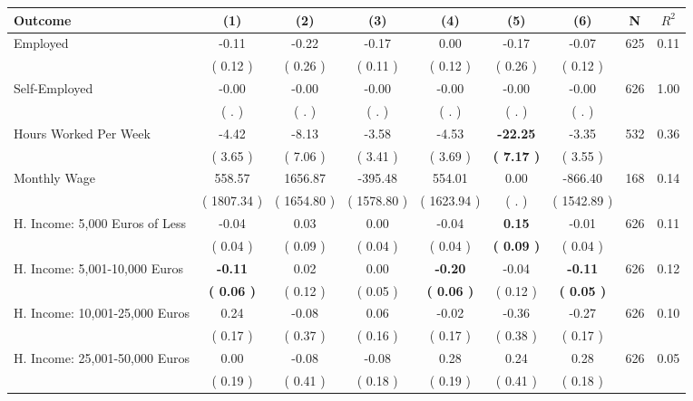 \begin{tabular}{lcccccccc}
\toprule
 \textbf{Outcome} & \textbf{(1)} & \textbf{(2)} & \textbf{(3)} & \textbf{(4)} & \textbf{(5)} & \textbf{(6)} & \textbf{N} & \textbf{$ R^2$} \\
\midrule
Employed &     -0.11 &     -0.22 &     -0.17 &      0.00 &     -0.17 &     -0.07 & 625 &       0.11 \\ 
 & (     0.12 ) & (     0.26 ) & (     0.11 ) & (     0.12 ) & (     0.26 ) & (     0.12 ) & \\
Self-Employed &     -0.00 &     -0.00 &     -0.00 &     -0.00 &     -0.00 &     -0.00 & 626 &       1.00 \\ 
 & (        . ) & (        . ) & (        . ) & (        . ) & (        . ) & (        . ) & \\
Hours Worked Per Week &     -4.42 &     -8.13 &     -3.58 &     -4.53 & \textbf{   -22.25} &     -3.35 & 532 &       0.36 \\ 
 & (     3.65 ) & (     7.06 ) & (     3.41 ) & (     3.69 ) & \textbf{(     7.17 )} & (     3.55 ) & \\
Monthly Wage &    558.57 &   1656.87 &   -395.48 &    554.01 &      0.00 &   -866.40 & 168 &       0.14 \\ 
 & (  1807.34 ) & (  1654.80 ) & (  1578.80 ) & (  1623.94 ) & (        . ) & (  1542.89 ) & \\
H. Income: 5,000 Euros of Less &     -0.04 &      0.03 &      0.00 &     -0.04 & \textbf{     0.15} &     -0.01 & 626 &       0.11 \\ 
 & (     0.04 ) & (     0.09 ) & (     0.04 ) & (     0.04 ) & \textbf{(     0.09 )} & (     0.04 ) & \\
H. Income: 5,001-10,000 Euros & \textbf{    -0.11} &      0.02 &      0.00 & \textbf{    -0.20} &     -0.04 & \textbf{    -0.11} & 626 &       0.12 \\ 
 & \textbf{(     0.06 )} & (     0.12 ) & (     0.05 ) & \textbf{(     0.06 )} & (     0.12 ) & \textbf{(     0.05 )} & \\
H. Income: 10,001-25,000 Euros &      0.24 &     -0.08 &      0.06 &     -0.02 &     -0.36 &     -0.27 & 626 &       0.10 \\ 
 & (     0.17 ) & (     0.37 ) & (     0.16 ) & (     0.17 ) & (     0.38 ) & (     0.17 ) & \\
H. Income: 25,001-50,000 Euros &      0.00 &     -0.08 &     -0.08 &      0.28 &      0.24 &      0.28 & 626 &       0.05 \\ 
 & (     0.19 ) & (     0.41 ) & (     0.18 ) & (     0.19 ) & (     0.41 ) & (     0.18 ) & \\

\end{tabular}
